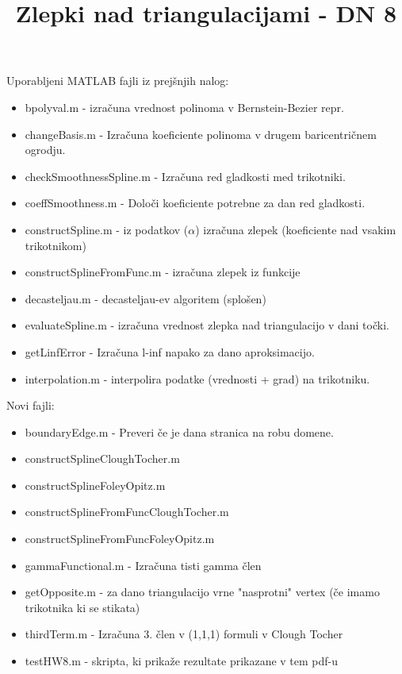 \documentclass{article}
\begin{document}
\title{Zlepki nad triangulacijami - DN 8}
\maketitle

Uporabljeni MATLAB fajli iz prejšnjih nalog:
\begin{itemize}
\item bpolyval.m - izračuna vrednost polinoma v Bernstein-Bezier repr.
\item changeBasis.m - Izračuna koeficiente polinoma v drugem baricentričnem ogrodju.
\item checkSmoothnessSpline.m - Izračuna red gladkosti med trikotniki.
\item coeffSmoothness.m - Določi koeficiente potrebne za dan red gladkosti.
\item constructSpline.m - iz podatkov ($\alpha$) izračuna zlepek (koeficiente nad vsakim trikotnikom)
\item constructSplineFromFunc.m - izračuna zlepek iz funkcije
\item decasteljau.m - decasteljau-ev algoritem (splošen)
\item evaluateSpline.m - izračuna vrednost zlepka nad triangulacijo v dani točki.
\item getLinfError - Izračuna l-inf napako za dano aproksimacijo.
\item interpolation.m - interpolira podatke (vrednosti + grad) na trikotniku.
\end{itemize}

Novi fajli:
\begin{itemize}
\item boundaryEdge.m - Preveri če je dana stranica na robu domene.
\item constructSplineCloughTocher.m
\item constructSplineFoleyOpitz.m
\item constructSplineFromFuncCloughTocher.m
\item constructSplineFromFuncFoleyOpitz.m
\item gammaFunctional.m - Izračuna tisti gamma člen
\item getOpposite.m - za dano triangulacijo vrne "nasprotni" vertex (če imamo trikotnika ki se stikata)
\item thirdTerm.m - Izračuna 3. člen v (1,1,1) formuli v Clough Tocher
\item testHW8.m - skripta, ki prikaže rezultate prikazane v tem pdf-u
\end{itemize}
\end{document}

